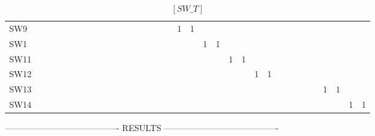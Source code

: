 \documentclass[nols,a4paper,twoside,notoc,fleqn]{tufte-book}
\begin{document}
\begin{table}[h!]
{\begin{tabular}{lrrrrrrrrrrrrrrrrrrrrrrrrrrrrrrrrr}
	SW9  &     &     &     &     &     &     &     &     &     &      &      &      &      &      &      &      &    1 &    1 &      &      &      &      &      &      &      &      &      &      &      &      &      &      &      \\
	SW1  &     &     &     &     &     &     &     &     &     &      &      &      &      &      &      &      &      &      &    1 &    1 &      &      &      &      &      &      &      &      &      &      &      &      &      \\
	SW11 &     &     &     &     &     &     &     &     &     &      &      &      &      &      &      &      &      &      &      &      &    1 &    1 &      &      &      &      &      &      &      &      &      &      &      \\
	SW12 &     &     &     &     &     &     &     &     &     &      &      &      &      &      &      &      &      &      &      &      &      &      &    1 &    1 &      &      &      &      &      &      &      &      &      \\
	SW13 &     &     &     &     &     &     &     &     &     &      &      &      &      &      &      &      &      &      &      &      &      &      &      &      &      &      &      &      &      &    1 &    1 &      &      \\
	SW14 &     &     &     &     &     &     &     &     &     &      &      &      &      &      &      &      &      &      &      &      &      &      &      &      &      &      &      &      &      &      &      &    1 &    1 \\
\end{tabular}
}
\caption{$[SW\_T]$}
\end{table}


\begin{table}[h!]
	\caption{$[SW\_states]$}
\end{table}




---------------------------------------- RESULTS ----------------------------------------
\end{document}
